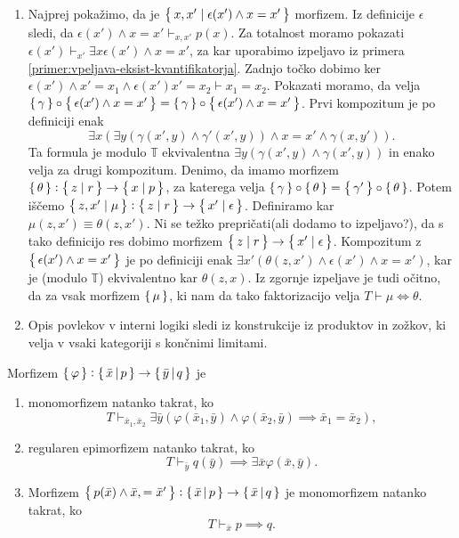 \documentclass[../kategoricna_logika.tex]{subfiles}
\begin{document}
\begin{dokaz}
\begin{enumerate}[label=(\roman*)]
  \item Najprej pokažimo, da je $\left\lbrace\,x,x' \mid \epsilon(x') \land x = x'\,\right\rbrace$ morfizem.
    Iz definicije $\epsilon$ sledi, da $\epsilon(x') \land x = x' \vdash_{x,x'} p(x)$.
    Za totalnost moramo pokazati $\epsilon(x') \vdash_{x'} \exists x \epsilon(x') \land x=x'$,
    za kar uporabimo izpeljavo iz primera \ref{primer:vpeljava-eksist-kvantifikatorja}.
    Zadnjo točko dobimo ker $\epsilon(x') \land x'=x_1 \land \epsilon(x') x'= x_2 \vdash x_1 = x_2$.
    Pokazati moramo, da velja $\left\lbrace\,\gamma\,\right\rbrace \circ \left\lbrace\,\epsilon(x') \land x = x'\,\right\rbrace =
    \left\lbrace\,\gamma\,\right\rbrace \circ \left\lbrace\,\epsilon(x') \land x = x'\,\right\rbrace$.
    Prvi kompozitum je po definiciji enak
    \[\exists x( \exists y(\gamma(x',y) \land \gamma'(x',y)) \land x = x' \land \gamma(x,y')). \]
    Ta formula je modulo $\mathbb{T}$ ekvivalentna $\exists y(\gamma(x',y) \land \gamma(x',y))$
    in enako velja za drugi kompozitum.
    Denimo, da imamo morfizem $\left\lbrace\,\theta\,\right\rbrace : \left\lbrace\,z \mid r\,\right\rbrace \to \left\lbrace\,x \mid p\,\right\rbrace$,
    za katerega velja $\left\lbrace\,\gamma\,\right\rbrace \circ \left\lbrace\,\theta\,\right\rbrace = \left\lbrace\,\gamma'\,\right\rbrace \circ \left\lbrace\,\theta\,\right\rbrace$.
    Potem iščemo $\left\lbrace\,z,x' \mid \mu\,\right\rbrace : \left\lbrace\,z \mid r\,\right\rbrace \to \left\lbrace\,x' \mid \epsilon\,\right\rbrace$.
    Definiramo kar $\mu(z,x') \equiv  \theta(z,x')$. Ni se težko prepričati(ali dodamo to izpeljavo?),
    da s tako definicijo res dobimo morfizem $\left\lbrace\,z \mid r\,\right\rbrace \to \left\lbrace\,x' \mid \epsilon\,\right\rbrace$.
    Kompozitum z $\left\lbrace\,\epsilon(x') \land x = x'\,\right\rbrace$ je po definiciji enak
    $\exists x' (\theta(z,x') \land \epsilon(x') \land x=x')$, kar
    je (modulo $\mathbb{T}$) ekvivalentno kar $\theta(z,x)$.
    Iz zgornje izpeljave je tudi očitno, da za vsak morfizem $\left\lbrace\,\mu\,\right\rbrace$,
    ki nam da tako faktorizacijo velja $T \vdash \mu \iff \theta$.

  \item Opis povlekov v interni logiki sledi iz konstrukcije iz produktov
    in zožkov, ki velja v vsaki kategoriji s končnimi limitami.
  \end{enumerate}
\end{dokaz}
\begin{lema}
  Morfizem $\left\lbrace\,\varphi\,\right\rbrace : \left\lbrace\,\bar{x}\,\middle|\, p\,\right\rbrace \to \left\lbrace\,\bar{y}\,\middle|\, q\,\right\rbrace$ je
  \begin{enumerate}[label=(\roman*)]
    \item monomorfizem natanko takrat, ko
      $$T \vdash_{\bar{x}_1,\bar{x}_2}  \exists \bar{y} \left( \varphi(\bar{x}_1,\bar{y}) \wedge \varphi(\bar{x}_2,\bar{y}) \implies \bar{x}_1 = \bar{x}_2 \right),$$
    \item regularen epimorfizem natanko takrat, ko
      $$T \vdash_{\bar{y}} q(\bar{y}) \implies \exists \bar{x} \varphi(\bar{x},\bar{y}).$$
    \item Morfizem $\left\lbrace\,p(\bar{x}) \wedge \bar{x}, = \bar{x}'\,\right\rbrace : \left\lbrace\,\bar{x}\,\middle|\, p \,\right\rbrace \to \left\lbrace\,\bar{x}\,\middle|\, q\,\right\rbrace$ je monomorfizem natanko takrat, ko
      $$T \vdash_{\bar{x}} p \implies q.$$
  \end{enumerate}
\end{lema}
\end{document}
